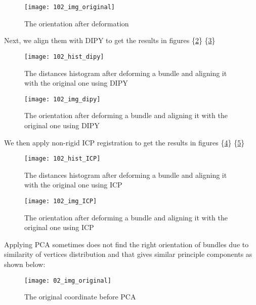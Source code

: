 \documentclass[../structure.tex]{subfiles}
\begin{document}
\begin{figure}[h!]
\centering
\texttt{[image: 102\_img\_original]}
\captionsetup{justification=centering}
\caption{The orientation after deformation}
\label{fig:img_original_def}
\end{figure}
\pagebreak

Next, we align them with DIPY to get the results in figures \{\ref{fig:hist_dipy_def}\} \{\ref{fig:img_dipy_def}\}

\begin{figure}[h!]
\centering
\texttt{[image: 102\_hist\_dipy]}
\captionsetup{justification=centering}
\caption{The distances histogram after deforming a bundle and aligning it with the original one using DIPY}
\label{fig:hist_dipy_def}
\end{figure}

\begin{figure}[h!]
\centering
\texttt{[image: 102\_img\_dipy]}
\captionsetup{justification=centering}
\caption{The orientation after deforming a bundle and aligning it with the original one using DIPY}
\label{fig:img_dipy_def}
\end{figure}
\pagebreak
We then apply non-rigid ICP registration to get the results in figures \{\ref{fig:hist_icp_def}\} \{\ref{fig:img_icp_def}\}

\begin{figure}[h!]
\centering
\texttt{[image: 102\_hist\_ICP]}
\captionsetup{justification=centering}
\caption{The distances histogram after deforming a bundle and aligning it with the original one using ICP}
\label{fig:hist_icp_def}
\end{figure}

\begin{figure}[h!]
\centering
\texttt{[image: 102\_img\_ICP]}
\captionsetup{justification=centering}
\caption{The orientation after deforming a bundle and aligning it with the original one using ICP}
\label{fig:img_icp_def}
\end{figure}

\pagebreak

Applying PCA sometimes does not find the right orientation of bundles due to similarity of vertices distribution and that gives similar principle components as shown below:


	\begin{figure}[h!]
	\centering
	\texttt{[image: 02\_img\_original]}
	\captionsetup{justification=centering}
	\caption{The original coordinate before PCA}
	\label{fig:all_brain}
	\end{figure}
	
\end{document}

